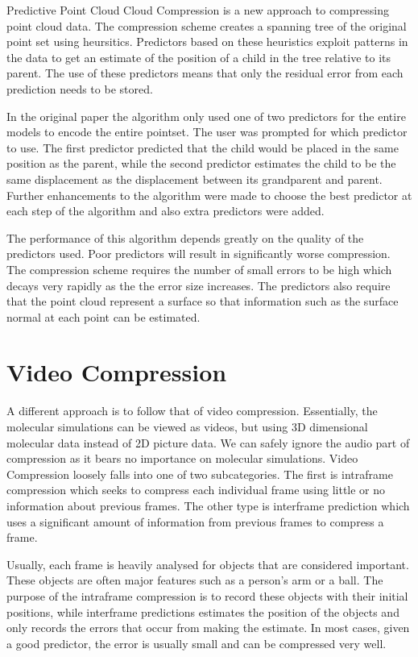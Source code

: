 \documentclass[a4paper,11pt]{report}
\begin{document}
Predictive Point Cloud Cloud Compression is a new approach to compressing point cloud data. The compression scheme creates a spanning tree of the original point set using heursitics.\cite{gumholdcomp} Predictors based on these heuristics exploit patterns in the data to get an estimate of the position of a child in the tree relative to its parent. The use of these predictors means that only the residual error from each prediction needs to be stored.

In the original paper the algorithm only used one of two predictors for the entire models to encode the entire pointset. The user was prompted for which predictor to use. The first predictor predicted that the child would be placed in the same position as the parent, while the second predictor estimates the child to be the same displacement as the displacement between its grandparent and parent. Further enhancements to the algorithm were made to choose the best predictor at each step of the algorithm and also extra predictors were added.\cite{merrycomp}

The performance of this algorithm depends greatly on the quality of the predictors used. Poor predictors will result in significantly worse compression. The compression scheme requires the number of small errors to be high which decays very rapidly as the the error size increases. The predictors also require that the point cloud represent a surface so that information such as the surface normal at each point can be estimated.

\section{Video Compression}

A different approach is to follow that of video compression. Essentially, the molecular simulations can be viewed as videos, but using 3D dimensional molecular data instead of 2D picture data. We can safely ignore the audio part of compression as it bears no importance on molecular simulations. Video Compression loosely falls into one of two subcategories. The first is intraframe compression which seeks to compress each individual frame using little or no information about previous frames. The other type is interframe prediction which uses a significant amount of information from previous frames to compress a frame. 

Usually, each frame is heavily analysed for objects that are considered important. These objects are often major features such as a person's arm or a ball. The purpose of the intraframe compression is to record these objects with their initial positions, while interframe predictions estimates the position of the objects and only records the errors that occur from making the estimate. In most cases, given a good predictor, the error is usually small and can be compressed very well.
\end{document}
